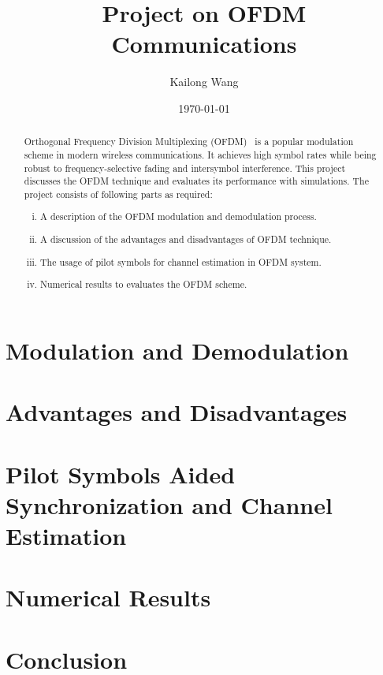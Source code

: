 \documentclass{article}
\title{Project on OFDM Communications}
\author{Kailong Wang}
\date{\today}
\begin{document}
\maketitle

\begin{abstract}
    Orthogonal Frequency Division Multiplexing (OFDM)~\cite{5307460} is a popular modulation scheme in modern wireless communications. It achieves high symbol rates while being robust to frequency-selective fading and intersymbol interference. This project discusses the OFDM technique and evaluates its performance with simulations. The project consists of following parts as required:
    \begin{enumerate}[(i)]
        \item A description of the OFDM modulation and demodulation process.
        \item A discussion of the advantages and disadvantages of OFDM technique.
        \item The usage of pilot symbols for channel estimation in OFDM system.
        \item Numerical results to evaluates the OFDM scheme.
    \end{enumerate}
\end{abstract}

\section{Modulation and Demodulation}
\label{sec:modulation}


\section{Advantages and Disadvantages}


\section{Pilot Symbols Aided Synchronization and Channel Estimation}


\section{Numerical Results}


\section{Conclusion}

\clearpage
\printbibliography
\end{document}
